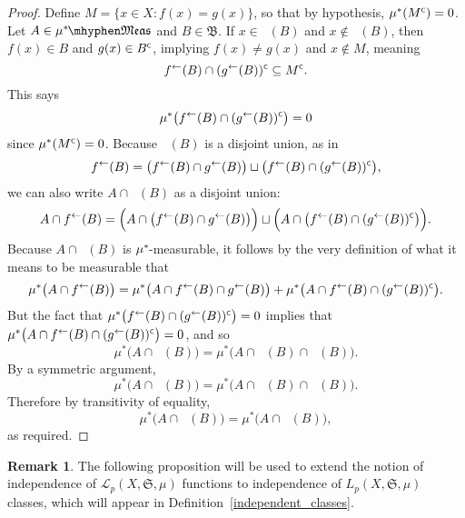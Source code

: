 \documentclass[
twoside=true,
paper=letter,
fontsize=9pt,
pagesize=auto,
leqno,
openany,
headsepline,
overfullrule,
]{scrbook}
\theoremstyle{plain}
\theoremstyle{plain}
\theoremstyle{definition}
\newtheorem{rmk}[thm]{Remark}
\theoremstyle{bfnoteitalic}
\theoremstyle{bfnoteroman}
\newcommand{\sigalg}[1]{\mathfrak{#1}}
\newcommand{\cali}[1]{\mathscr{#1}}
\newcommand{\comp}{^{\hbox{\tiny{$\mathsf C$}}}}
\newcommand{\preimage}[1]{\mathop{#1^{\leftarrow}}}
\newcommand{\meets}{\cap}
\newcommand{\semiring}{\sigalg{S}}
\newcommand{\sigmaalgebraii}{\sigalg{B}}
\newcommand{\measurable}[1]{{#1}\mhyphen\mathfrak{Meas}}
\newcommand{\kernast}{\ast\kern-1pt}
\newcommand{\measurespace}{X}
\newcommand{\mspaceelt}{x}
\newcommand{\measure}{\mu}
\begin{document}
\begin{proof}
Define $M=\{\mspaceelt\in\measurespace : f(\mspaceelt) = g(\mspaceelt)\}$, so that  by hypothesis,
$\measure^*(M\comp) = 0$. Let $A\in \measurable{\measure^\kernast}$ and $B\in\sigmaalgebraii$.
If $\mspaceelt\in\preimage{f}(B)$ and $\mspaceelt\notin\preimage{g}(B)$, then 
$f(\mspaceelt)\in B$ and $g(\mspaceelt)\in B\comp$, implying 
$f(\mspaceelt)\neq g(\mspaceelt)$ and $\mspaceelt\notin M$, meaning 
\[
\preimage{f}(B)\meets (\preimage{g}(B))\comp 
\subseteq 
M\comp.
\]
This says 
\[
\measure^*\bigl(\preimage{f}(B)\meets (\preimage{g}(B))\comp\bigr) = 0
\]
since $\measure^*(M\comp)=0$. 
Because $\preimage{f}(B)$ is a disjoint union, as in
\[
\preimage{f}(B)
=
\bigl(\preimage{f}(B) \meets \preimage{g}(B)\bigr) 
\sqcup
\bigl(\preimage{f}(B) \meets (\preimage{g}(B))\comp\bigr),
\]
we can also write $A\meets\preimage{f}(B)$ as a disjoint union:
\[
A\meets \preimage{f}(B)
=
\Bigl(A\meets\bigl(\preimage{f}(B) \meets \preimage{g}(B)\bigr) \Bigr)
\sqcup
\Bigl(A\meets\bigl(\preimage{f}(B) \meets (\preimage{g}(B))\comp\bigr)\Bigr).
\]
Because $A\meets\preimage{f}(B)$ is $\measure^\kernast$-measurable, it follows by the very definition of what it means to be measurable that
\[
\measure^*\bigl(A\meets \preimage{f}(B)\bigr)
=
\measure^*\bigl(A\meets\preimage{f}(B) \meets \preimage{g}(B)\bigr)
+
\measure^*\bigl(A\meets\preimage{f}(B) \meets (\preimage{g}(B))\comp\bigr).
\]
But the fact that $\measure^*\bigl(\preimage{f}(B)\meets (\preimage{g}(B))\comp\bigr) = 0$
implies that 
$\measure^*\bigl(A\meets\preimage{f}(B)\meets (\preimage{g}(B))\comp\bigr) = 0$,
and so 
\[
\measure^*\bigl(A\meets\preimage{f}(B)\bigr)
=
\measure^*\bigl(A\meets\preimage{f}(B) \meets \preimage{g}(B)\bigr).
\]
By a symmetric argument, 
\[
\measure^*\bigl(A\meets\preimage{g}(B)\bigr)
=
\measure^*\bigl(A\meets\preimage{f}(B) \meets \preimage{g}(B)\bigr).
\]
Therefore by transitivity of equality,
\[
\measure^*\bigl(A\meets\preimage{f}(B)\bigr)
=
\measure^*\bigl(A\meets\preimage{g}(B)\bigr),
\]
as required.
\end{proof}


\begin{rmk}
The following proposition will be used to extend the notion of independence of 
$\cali{L}_p(\measurespace, \semiring, \measure)$
functions to independence of 
$L_p(\measurespace, \semiring, \measure)$
classes, which will appear in Definition~\ref{independent_classes}.
\end{rmk}
\end{document}
